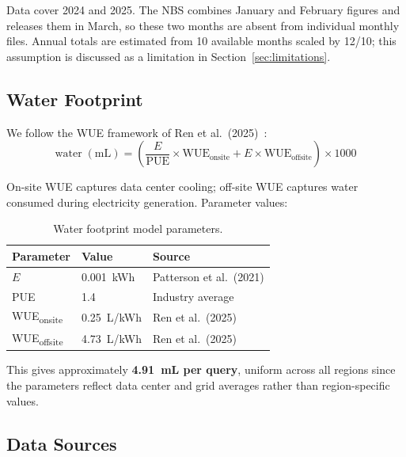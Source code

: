 \documentclass[11pt,a4paper]{article}
\begin{document}
Data cover 2024 and 2025. The NBS combines January and February figures and
releases them in March, so these two months are absent from individual
monthly files. Annual totals are estimated from 10 available months scaled
by 12/10; this assumption is discussed as a limitation in
Section~\ref{sec:limitations}.

\subsection{Water Footprint}

We follow the WUE framework of Ren et al.\ (2025)~\cite{ren2025}:
\begin{equation}
  \text{water} \; (\text{mL}) =
  \left(\frac{E}{\text{PUE}} \times \text{WUE}_{\text{onsite}}
   + E \times \text{WUE}_{\text{offsite}}\right) \times 1000
\end{equation}

On-site WUE captures data center cooling; off-site WUE captures water
consumed during electricity generation. Parameter values:

\begin{table}[h]
\centering
\renewcommand{\arraystretch}{1.2}
\begin{tabular}{lll}
\toprule
Parameter & Value & Source \\
\midrule
$E$ & 0.001~kWh & Patterson et al.\ (2021) \\
PUE & 1.4 & Industry average \\
WUE\textsubscript{onsite}  & 0.25~L/kWh & Ren et al.\ (2025) \\
WUE\textsubscript{offsite} & 4.73~L/kWh & Ren et al.\ (2025) \\
\bottomrule
\end{tabular}
\vspace{4pt}
\caption{Water footprint model parameters.}
\end{table}

This gives approximately \textbf{4.91~mL per query}, uniform across all
regions since the parameters reflect data center and grid averages rather
than region-specific values.

\subsection{Data Sources}
\end{document}
